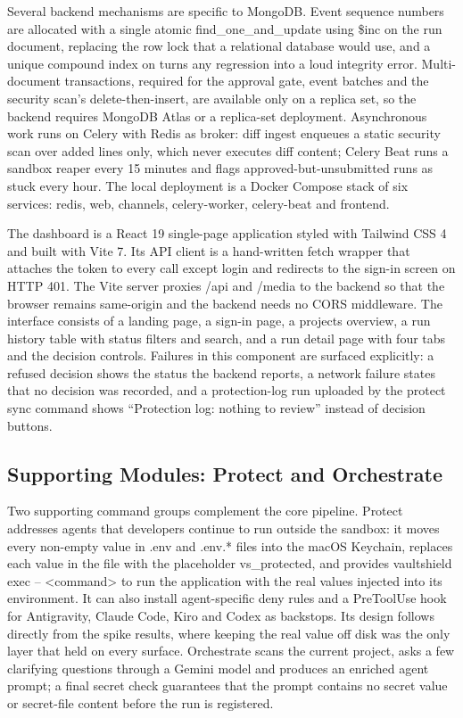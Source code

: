 \documentclass[12pt,a4paper,oneside]{report}
\begin{document}
Several backend mechanisms are specific to MongoDB. Event sequence numbers are allocated with a single atomic find\_\allowbreak{}one\_\allowbreak{}and\_\allowbreak{}update using \$inc on the run document, replacing the row lock that a relational database would use, and a unique compound index on turns any regression into a loud integrity error. Multi-document transactions, required for the approval gate, event batches and the security scan's delete-then-insert, are available only on a replica set, so the backend requires MongoDB Atlas or a replica-set deployment. Asynchronous work runs on Celery with Redis as broker: diff ingest enqueues a static security scan over added lines only, which never executes diff content; Celery Beat runs a sandbox reaper every 15 minutes and flags approved-but-unsubmitted runs as stuck every hour. The local deployment is a Docker Compose stack of six services: redis, web, channels, celery-worker, celery-beat and frontend.

The dashboard is a React 19 single-page application styled with Tailwind CSS 4 and built with Vite 7. Its API client is a hand-written fetch wrapper that attaches the token to every call except login and redirects to the sign-in screen on HTTP 401. The Vite server proxies /api and /media to the backend so that the browser remains same-origin and the backend needs no CORS middleware. The interface consists of a landing page, a sign-in page, a projects overview, a run history table with status filters and search, and a run detail page with four tabs and the decision controls. Failures in this component are surfaced explicitly: a refused decision shows the status the backend reports, a network failure states that no decision was recorded, and a protection-log run uploaded by the protect sync command shows ``Protection log: nothing to review'' instead of decision buttons.

\subsection{Supporting Modules: Protect and Orchestrate}\label{supporting-modules-protect-and-orchestrate}

Two supporting command groups complement the core pipeline. Protect addresses agents that developers continue to run outside the sandbox: it moves every non-empty value in .env and .env.* files into the macOS Keychain, replaces each value in the file with the placeholder vs\_\allowbreak{}protected, and provides vaultshield exec -- <command> to run the application with the real values injected into its environment. It can also install agent-specific deny rules and a PreToolUse hook for Antigravity, Claude Code, Kiro and Codex as backstops. Its design follows directly from the spike results, where keeping the real value off disk was the only layer that held on every surface. Orchestrate scans the current project, asks a few clarifying questions through a Gemini model and produces an enriched agent prompt; a final secret check guarantees that the prompt contains no secret value or secret-file content before the run is registered.
\end{document}
